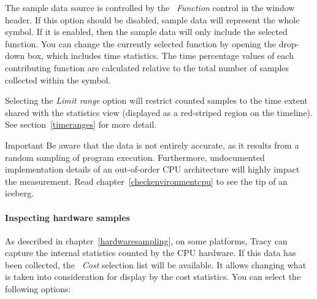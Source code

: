 \documentclass[hidelinks,titlepage,a4paper]{article}
\begin{document}
The sample data source is controlled by the \emph{\faSitemap{}~Function} control in the window header. If this option should be disabled, sample data will represent the whole symbol. If it is enabled, then the sample data will only include the selected function. You can change the currently selected function by opening the drop-down box, which includes time statistics. The time percentage values of each contributing function are calculated relative to the total number of samples collected within the symbol.

Selecting the \emph{Limit range} option will restrict counted samples to the time extent shared with the statistics view (displayed as a red-striped region on the timeline). See section~\ref{timeranges} for more detail.

\begin{bclogo}[
noborder=true,
couleur=black!5,
logo=\bcbombe
]{Important}
Be aware that the data is not entirely accurate, as it results from a random sampling of program execution. Furthermore, undocumented implementation details of an out-of-order CPU architecture will highly impact the measurement. Read chapter~\ref{checkenvironmentcpu} to see the tip of an iceberg.
\end{bclogo}

\paragraph{Inspecting hardware samples}

As described in chapter~\ref{hardwaresampling}, on some platforms, Tracy can capture the internal statistics counted by the CPU hardware. If this data has been collected, the \emph{\faHighlighter{}~Cost} selection list will be available. It allows changing what is taken into consideration for display by the cost statistics. You can select the following options:
\end{document}
